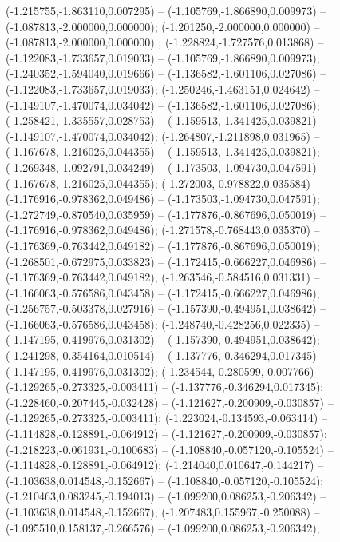  (-1.215755,-1.863110,0.007295) -- (-1.105769,-1.866890,0.009973) -- (-1.087813,-2.000000,0.000000);
 (-1.201250,-2.000000,0.000000) -- (-1.087813,-2.000000,0.000000) ;
 (-1.228824,-1.727576,0.013868) -- (-1.122083,-1.733657,0.019033) -- (-1.105769,-1.866890,0.009973);
 (-1.240352,-1.594040,0.019666) -- (-1.136582,-1.601106,0.027086) -- (-1.122083,-1.733657,0.019033);
 (-1.250246,-1.463151,0.024642) -- (-1.149107,-1.470074,0.034042) -- (-1.136582,-1.601106,0.027086);
 (-1.258421,-1.335557,0.028753) -- (-1.159513,-1.341425,0.039821) -- (-1.149107,-1.470074,0.034042);
 (-1.264807,-1.211898,0.031965) -- (-1.167678,-1.216025,0.044355) -- (-1.159513,-1.341425,0.039821);
 (-1.269348,-1.092791,0.034249) -- (-1.173503,-1.094730,0.047591) -- (-1.167678,-1.216025,0.044355);
 (-1.272003,-0.978822,0.035584) -- (-1.176916,-0.978362,0.049486) -- (-1.173503,-1.094730,0.047591);
 (-1.272749,-0.870540,0.035959) -- (-1.177876,-0.867696,0.050019) -- (-1.176916,-0.978362,0.049486);
 (-1.271578,-0.768443,0.035370) -- (-1.176369,-0.763442,0.049182) -- (-1.177876,-0.867696,0.050019);
 (-1.268501,-0.672975,0.033823) -- (-1.172415,-0.666227,0.046986) -- (-1.176369,-0.763442,0.049182);
 (-1.263546,-0.584516,0.031331) -- (-1.166063,-0.576586,0.043458) -- (-1.172415,-0.666227,0.046986);
 (-1.256757,-0.503378,0.027916) -- (-1.157390,-0.494951,0.038642) -- (-1.166063,-0.576586,0.043458);
 (-1.248740,-0.428256,0.022335) -- (-1.147195,-0.419976,0.031302) -- (-1.157390,-0.494951,0.038642);
 (-1.241298,-0.354164,0.010514) -- (-1.137776,-0.346294,0.017345) -- (-1.147195,-0.419976,0.031302);
 (-1.234544,-0.280599,-0.007766) -- (-1.129265,-0.273325,-0.003411) -- (-1.137776,-0.346294,0.017345);
 (-1.228460,-0.207445,-0.032428) -- (-1.121627,-0.200909,-0.030857) -- (-1.129265,-0.273325,-0.003411);
 (-1.223024,-0.134593,-0.063414) -- (-1.114828,-0.128891,-0.064912) -- (-1.121627,-0.200909,-0.030857);
 (-1.218223,-0.061931,-0.100683) -- (-1.108840,-0.057120,-0.105524) -- (-1.114828,-0.128891,-0.064912);
 (-1.214040,0.010647,-0.144217) -- (-1.103638,0.014548,-0.152667) -- (-1.108840,-0.057120,-0.105524);
 (-1.210463,0.083245,-0.194013) -- (-1.099200,0.086253,-0.206342) -- (-1.103638,0.014548,-0.152667);
 (-1.207483,0.155967,-0.250088) -- (-1.095510,0.158137,-0.266576) -- (-1.099200,0.086253,-0.206342);
